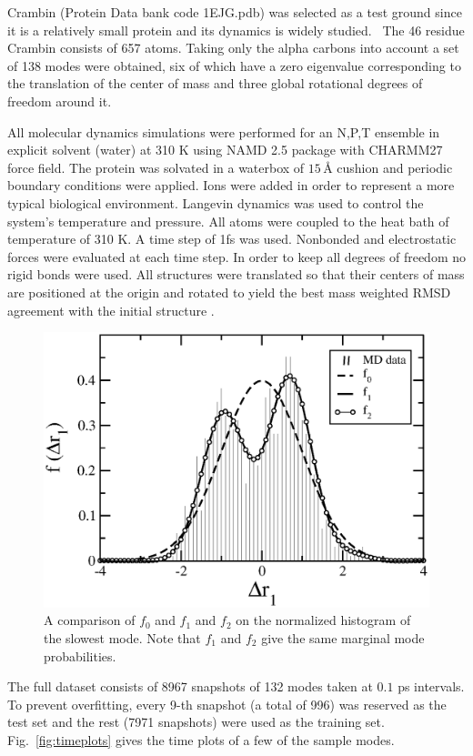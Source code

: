 \documentclass[12pt,article]{iopart}
\begin{document}
Crambin (Protein Data bank code 1EJG.pdb) was selected as a test
ground since it is a relatively small protein and its dynamics is
widely
studied.~\cite{teeter1990harmonic,levitt1985protein,lange2006can} The
46 residue Crambin consists of 657 atoms. Taking only the alpha
carbons into account a set of 138 modes were obtained, six of which
have a zero eigenvalue corresponding to the translation of the center of mass 
and three global rotational degrees of freedom around it. 

All molecular
dynamics simulations were performed for an N,P,T ensemble in explicit
solvent (water) at 310 K using NAMD 2.5 package with CHARMM27 force
field. The protein was solvated in a waterbox of $15\,${\AA} cushion and
periodic boundary conditions were applied. Ions were added in order to
represent a more typical biological environment. Langevin dynamics was
used to control the system's temperature and pressure. All atoms were
coupled to the heat bath of temperature of 310 K. A time step of 1fs
was used. Nonbonded and electrostatic forces were evaluated at each time
step. In order to keep all degrees of freedom no rigid bonds were
used.  All structures were translated so that their centers of mass are
positioned at the origin and rotated to yield the best mass weighted
RMSD agreement with the initial structure \cite{yogurtcu2009statistical}.

\begin{figure}[h!]\centering
\vspace{20pt}
  \includegraphics[width=.4\textwidth]{fig3.eps}
\caption{A comparison of $f_0$ and $f_1$ and $f_2$ on the normalized
  histogram of the slowest mode. Note that $f_1$ and $f_2$ give the
  same marginal mode probabilities.}
\label{fig:f1histogram}
\end{figure}

The full dataset consists of 8967 snapshots of 132 modes taken at $0.1$ ps
intervals.  To prevent overfitting, every 9-th snapshot (a total of
996) was reserved as the test set and the rest (7971 snapshots) were
used as the training set.
Fig.~\ref{fig:timeplots} gives the time plots of a few of the sample
modes.  
\end{document}
